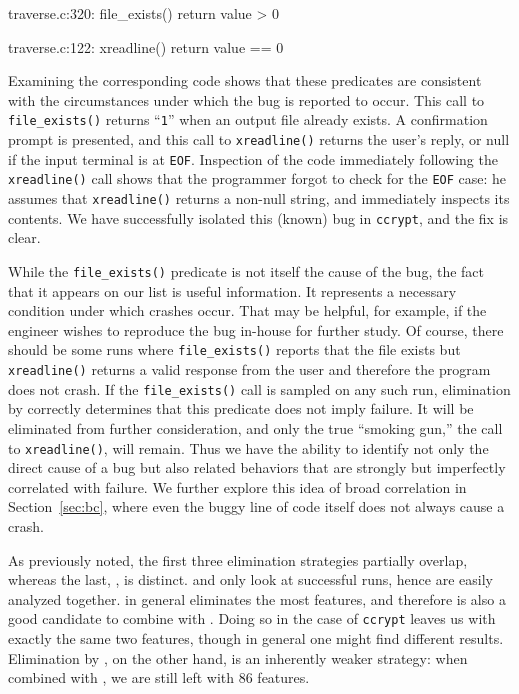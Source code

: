 \begin{features}
\item traverse.c:320: file\_exists() return value > 0
\item traverse.c:122: xreadline() return value == 0
\end{features}

Examining the corresponding code shows that these predicates are
consistent with the circumstances under which the bug is reported to
occur.  This call to \texttt{file\_exists()} returns ``\texttt{1}'' when an output
file already exists.  A confirmation prompt is presented, and this
call to \texttt{xreadline()} returns the user's reply, or null if the
input terminal is at \texttt{EOF}.  Inspection of the code immediately
following the \texttt{xreadline()} call shows that the programmer
forgot to check for the \texttt{EOF} case: he assumes that
\texttt{xreadline()} returns a non-null string, and immediately
inspects its contents.  We have successfully isolated this (known) bug
in \texttt{ccrypt}, and the fix is clear.

While the \texttt{file\_exists()} predicate is not itself the cause of
the bug, the fact that it appears on our list is useful information.
It represents a necessary condition under which crashes occur.  That
may be helpful, for example, if the engineer wishes to reproduce the
bug in-house for further study.  Of course, there should be some runs
where \texttt{file\_exists()} reports that the file exists but
\texttt{xreadline()} returns a valid response from the user and
therefore the program does not crash.  If the \texttt{file\_exists()}
call is sampled on any such run, elimination by  correctly determines that this predicate does not
imply failure.  It will be eliminated from further consideration, and
only the true ``smoking gun,'' the call to \texttt{xreadline()}, will
remain.  Thus we have the ability to identify not only the direct
cause of a bug but also related behaviors that are strongly but
imperfectly correlated with failure.  We further explore this idea of
broad correlation in Section~\ref{sec:bc}, where even the buggy line
of code itself does not always cause a crash.

As previously noted, the first three elimination strategies partially
overlap, whereas the last, , is
distinct.   and  only look at successful runs, hence are easily
analyzed together.   in general
eliminates the most features, and therefore is also a good candidate
to combine with .  Doing so in the
case of \texttt{ccrypt} leaves us with exactly the same two features,
though in general one might find different results.  Elimination by
, on the other hand, is an inherently
weaker strategy: when combined with ,
we are still left with 86 features.


